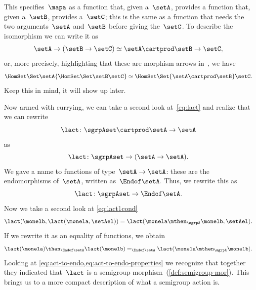 This specifies~$\mapa$ as a function that, given a~$\setA$, provides a function that, given a~$\setB$, provides a~$\setC$;
this is the same as a function that needs the two arguments~$\setA$ and~$\setB$ before giving the~$\setC$.
To describe the isomorphism we can write it as
\begin{equation}
    \label{eq:currying-iso-1}
    \setA \to ( \setB \to \setC) \simeq  \setA \cartprod \setB \to \setC,
\end{equation}
or, more precisely, highlighting that these are morphism arrows in~\Set, we have
\begin{equation}
    \label{eq:currying-iso-2}
    \HomSet\Set\setA{\HomSet\Set\setB\setC} \simeq \HomSet\Set{\setA \cartprod \setB}\setC.
\end{equation}
Keep this in mind, it will show up later.

Now armed with currying, we can take a second look at~\cref{eq:lact} and realize that we can rewrite
\begin{equation}
    \label{eq:currying-lact-1}
    \lact \colon \sgrpAset \cartprod \setA \to \setA
\end{equation}
as
\begin{equation}
    \label{eq:currying-lact-2}
    \lact \colon \sgrpAset \to (\setA \to \setA).
\end{equation}
%
We gave a name to functions of type~$\setA \to \setA$: these are the endomorphisms of~$\setA$, written as~$\Endof\setA$.
Thus, we rewrite this as
%
\begin{equation}
    \label{eq:act-to-endo}
    \lact \colon \sgrpAset \to \Endof\setA.
\end{equation}
%
Now we take a second look at \cref{eq:lact1cond}
%
\begin{equation}
    \label{eq:lact1cond-2}
    \lact(\monelb, \lact(\monela, \setAel)) = \lact(\monela \mthen_\sgrpA \monelb, \setAel).
\end{equation}
%
If we rewrite it as an equality of functions, we obtain
%
\begin{equation}
    \label{eq:act-to-endo-properties}
    \lact(\monela) \then_{\Endof\setA}  \lact(\monelb) =_{\Endof\setA} \lact(\monela \mthen_\sgrpA \monelb).
\end{equation}
%
Looking at \cref{eq:act-to-endo,eq:act-to-endo-properties} we recognize that together they indicated that~$\lact$ is a semigroup morphism~(\cref{def:semigroup-mor}).
This brings us to a more compact description of what a semigroup action is.


